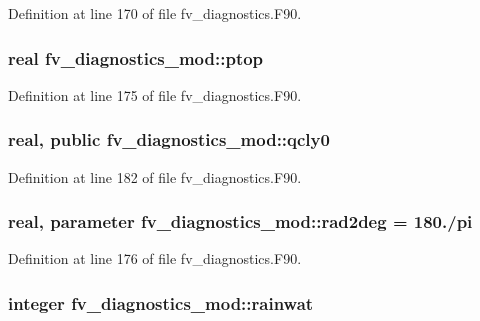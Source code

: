 Definition at line 170 of file fv\-\_\-diagnostics.\-F90.

\subsubsection[{ptop}]{\setlength{\rightskip}{0pt plus 5cm}real fv\-\_\-diagnostics\-\_\-mod\-::ptop\hspace{0.3cm}{\ttfamily [private]}}\label{classfv__diagnostics__mod_a204725397c8bd4f7f35ef71493dd144e}


Definition at line 175 of file fv\-\_\-diagnostics.\-F90.

\subsubsection[{qcly0}]{\setlength{\rightskip}{0pt plus 5cm}real, public fv\-\_\-diagnostics\-\_\-mod\-::qcly0}\label{classfv__diagnostics__mod_ab6c6b381b572220bf58a162677af1fe0}


Definition at line 182 of file fv\-\_\-diagnostics.\-F90.

\subsubsection[{rad2deg}]{\setlength{\rightskip}{0pt plus 5cm}real, parameter fv\-\_\-diagnostics\-\_\-mod\-::rad2deg = 180./pi\hspace{0.3cm}{\ttfamily [private]}}\label{classfv__diagnostics__mod_a32c755e2c70bf36c5ad6f2c862673a32}


Definition at line 176 of file fv\-\_\-diagnostics.\-F90.

\subsubsection[{rainwat}]{\setlength{\rightskip}{0pt plus 5cm}integer fv\-\_\-diagnostics\-\_\-mod\-::rainwat\hspace{0.3cm}{\ttfamily [private]}}\label{classfv__diagnostics__mod_a732b3c99ea8fce56be8203d5f7c4967e}


